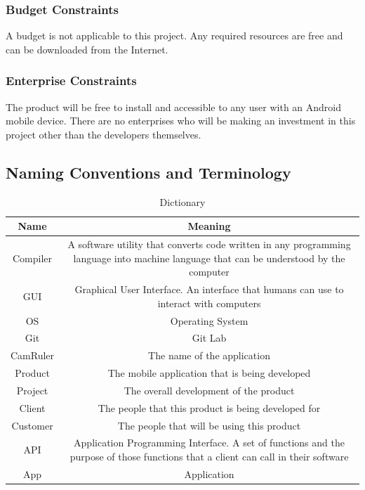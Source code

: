 \documentclass[12pt, titlepage]{article}
\begin{document}
\subsubsection{Budget Constraints}
A budget is not applicable to this project. Any required resources are free and can be downloaded from the Internet.

\subsubsection{Enterprise Constraints}
The product will be free to install and accessible to any user with an Android mobile device. There are no enterprises who will be making an investment in this project other than the developers themselves.

\subsection{Naming Conventions and Terminology}
\begin{table}[H]
\begin{center}
\begin{tabular}{|c|S|}
\hline
\hline
Name & Meaning\\
\hline
Compiler & A software utility that converts code written in any programming language into machine language that can be understood by the computer\\
\hline
GUI & Graphical User Interface. An interface that humans can use to interact with computers\\
\hline
OS & Operating System\\
\hline
Git & Git Lab\\
\hline
CamRuler & The name of the application\\
\hline
Product & The mobile application that is being developed\\
\hline
Project & The overall development of the product\\
\hline
Client & The people that this product is being developed for\\
\hline
Customer &  The people that will be using this product\\
\hline
API & Application Programming Interface. A set of functions and the purpose of those functions that a client can call in their software\\
\hline
App & Application\\
\hline
\hline
\end{tabular}
\caption{Dictionary}
\end{center}
\label{table:1}
\end{table}
\end{document}
